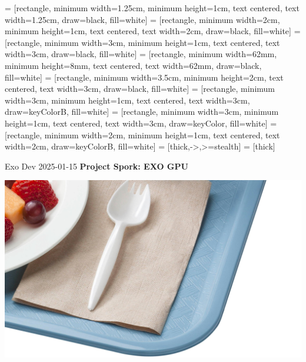 



 = [rectangle, minimum width=1.25cm, minimum height=1cm, text centered, text width=1.25cm, draw=black, fill=white]
 = [rectangle, minimum width=2cm, minimum height=1cm, text centered, text width=2cm, draw=black, fill=white]
 = [rectangle, minimum width=3cm, minimum height=1cm, text centered, text width=3cm, draw=black, fill=white]
 = [rectangle, minimum width=62mm, minimum height=8mm, text centered, text width=62mm, draw=black, fill=white]
 = [rectangle, minimum width=3.5cm, minimum height=2cm, text centered, text width=3cm, draw=black, fill=white]
 = [rectangle, minimum width=3cm, minimum height=1cm, text centered, text width=3cm, draw=keyColorB, fill=white]
 = [rectangle, minimum width=3cm, minimum height=1cm, text centered, text width=3cm, draw=keyColor, fill=white]
 = [rectangle, minimum width=2cm, minimum height=1cm, text centered, text width=2cm, draw=keyColorB, fill=white]
 = [thick,->,>=stealth]
 = [thick]

{ \LARGE Exo Dev 2025-01-15 \hfill \textbf{\textsf{Project Spork: EXO GPU}}}

\includegraphics[width=\linewidth]{usda_spork.jpg}

\newpage

